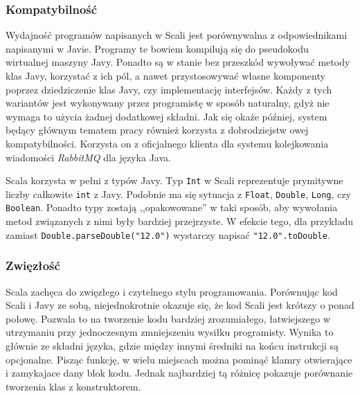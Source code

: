 \documentclass[wimgr]{xmgr}
\begin{document}
\subsubsection{Kompatybilność}

Wydajność programów napisanych w Scali jest porównywalna z odpowiednikami napisanymi w Javie. Programy te bowiem kompilują się do pseudokodu wirtualnej maszyny Javy. Ponadto są w stanie bez przeszkód wywoływać metody klas Javy, korzystać z ich pól, a nawet przystosowywać własne komponenty poprzez dziedziczenie klas Javy, czy implementację interfejsów. Każdy z tych wariantów jest wykonywany przez programistę w sposób naturalny, gdyż nie wymaga to użycia żadnej dodatkowej składni. Jak się okaże później, system będący głównym tematem pracy również korzysta z dobrodziejstw owej kompatybilności. Korzysta on z oficjalnego klienta dla systemu kolejkowania wiadomości \emph{RabbitMQ} dla języka Java.

Scala korzysta w pełni z typów Javy. Typ \texttt{Int} w Scali reprezentuje prymitywne liczby całkowite \texttt{int} z Javy. Podobnie ma się sytuacja z \texttt{Float}, \texttt{Double}, \texttt{Long}, czy \texttt{Boolean}. Ponadto typy zostają ,,opakowowane'' w taki sposób, aby wywołania metod związanych z nimi były bardziej przejrzyste. W efekcie tego, dla przykładu zamiast \texttt{Double.parseDouble("12.0")} wystarczy napisać \texttt{"12.0".toDouble}.

\subsubsection{Zwięzłość}

Scala zachęca do zwięzłego i czytelnego stylu programowania. Porównując kod Scali i Javy ze sobą, niejednokrotnie okazuje się, że kod Scali jest krótszy o ponad połowę. Pozwala to na tworzenie kodu bardziej zrozumiałego, łatwiejszego w utrzymaniu przy jednoczesnym zmniejszeniu wysiłku programisty. Wynika to głównie ze składni języka, gdzie między innymi średniki na końcu instrukcji są opcjonalne. Pisząc funkcję, w wielu miejscach można pominąć klamry otwierające i zamykajace dany blok kodu. Jednak najbardziej tą różnicę pokazuje porównanie tworzenia klas z konstruktorem.

\medskip 

\inputminted[fontsize=\small,label=Person.java,frame=single,framerule=0pt,framesep=2pt]{java}{code/person.java}

\inputminted[fontsize=\small,label=Person.scala,frame=single,framerule=0pt,framesep=2pt]{scala}{code/person.scala}
\end{document}

